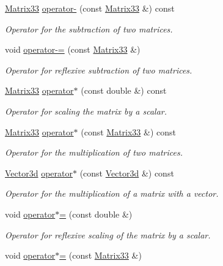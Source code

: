 \begin{DoxyCompactItemize}
\hyperlink{classMatrix33}{\-Matrix33} \hyperlink{classMatrix33_a372f71ec208bb6d3045acd4324b7cb06}{operator-\/} (const \hyperlink{classMatrix33}{\-Matrix33} \&) const 
\begin{DoxyCompactList}\small\item\em \-Operator for the subtraction of two matrices. \end{DoxyCompactList}\item 
void \hyperlink{classMatrix33_abc889e10a9c7c532195c7031c1344a74}{operator-\/=} (const \hyperlink{classMatrix33}{\-Matrix33} \&)
\begin{DoxyCompactList}\small\item\em \-Operator for reflexive subtraction of two matrices. \end{DoxyCompactList}\item 
\hyperlink{classMatrix33}{\-Matrix33} \hyperlink{classMatrix33_a6992fd2bb0b6e9ad71b5d3481c4e3e1a}{operator$\ast$} (const double \&) const 
\begin{DoxyCompactList}\small\item\em \-Operator for scaling the matrix by a scalar. \end{DoxyCompactList}\item 
\hyperlink{classMatrix33}{\-Matrix33} \hyperlink{classMatrix33_a525f14614255ff81c0cbab8060e8e065}{operator$\ast$} (const \hyperlink{classMatrix33}{\-Matrix33} \&) const 
\begin{DoxyCompactList}\small\item\em \-Operator for the multiplication of two matrices. \end{DoxyCompactList}\item 
\hyperlink{classVector3d}{\-Vector3d} \hyperlink{classMatrix33_a601584a1edbaae7c6a2a2874605d6f61}{operator$\ast$} (const \hyperlink{classVector3d}{\-Vector3d} \&) const 
\begin{DoxyCompactList}\small\item\em \-Operator for the multiplication of a matrix with a vector. \end{DoxyCompactList}\item 
void \hyperlink{classMatrix33_a83162791813bef030b1ceb5df3c5cae3}{operator$\ast$=} (const double \&)
\begin{DoxyCompactList}\small\item\em \-Operator for reflexive scaling of the matrix by a scalar. \end{DoxyCompactList}\item 
void \hyperlink{classMatrix33_ac3937bdeb034cc83b4adcad16cd58a26}{operator$\ast$=} (const \hyperlink{classMatrix33}{\-Matrix33} \&)

\end{DoxyCompactItemize}
